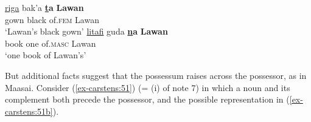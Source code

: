 \documentclass[output=paper
,modfonts
,nonflat]{langsci/langscibook}
\begin{document}
\begin{exe}
	 \citep[301]{Newman2000}
	\xlist
	\ex 
	\gll \uline{riga}   bak’a   \textbf{\uline{t}a}       \textbf{Lawan} \\
	gown   black   of.\textsc{fem}    Lawan\\
	\glt `Lawan’s black gown'  	
	\ex 
	\gll \uline{litafi}     guda \textbf{\uline{n}a}       \textbf{Lawan}\\
	book one  of.\textsc{masc}  Lawan\\
	\glt `one book of Lawan's'
	\endxlist
\end{exe}
But additional facts suggest that the possessum raises across the possessor, as in Maasai.  Consider (\ref{ex-carstens:51}) (= (i) of note 7) in which a noun and its complement both precede the possessor, and the possible representation in (\ref{ex-carstens:51b}). 
\end{document}
